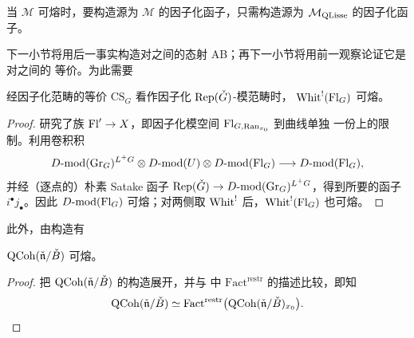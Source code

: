 \begin{remark}
当 $\mathcal{M}$ 可熔时，要构造源为 $\mathcal{M}$ 的因子化函子，只需构造源为
$\mathcal{M}_{\mathrm{QLisse}}$ 的因子化函子。

下一小节将用后一事实构造对之间的态射 AB；再下一小节将用前一观察论证它是对之间的
等价。为此需要
\end{remark}

\begin{proposition}
\label{prop:whitFl-fusable}
经因子化范畴的等价 $\mathrm{CS}_G$ 看作因子化 $\mathrm{Rep}(\check G)$-模范畴时，
$\mathrm{Whit}^{!}(\mathrm{Fl}_G)$ 可熔。
\end{proposition}

\begin{proof}
\cite{Gai04} 研究了族 $\mathrm{Fl}'\to X$，即因子化模空间 $\mathrm{Fl}_{G,\mathrm{Ran}_{x_0}}$ 到曲线单独
一份上的限制。利用卷积积
\[
D\text{-}\mathrm{mod}(\mathrm{Gr}_G)^{L^+G}\otimes D\text{-}\mathrm{mod}(U)
\otimes D\text{-}\mathrm{mod}(\mathrm{Fl}_G)\longrightarrow D\text{-}\mathrm{mod}(\mathrm{Fl}_G),
\]
并经（逐点的）朴素 Satake 函子
$\mathrm{Rep}(\check G)\to D\text{-}\mathrm{mod}(\mathrm{Gr}_G)^{L^+G}$，得到所要的函子
$i^{\bullet}j_{\bullet}$。因此 $D\text{-}\mathrm{mod}(\mathrm{Fl}_G)$ 可熔；对两侧取
$\mathrm{Whit}^{!}$ 后，$\mathrm{Whit}^{!}(\mathrm{Fl}_G)$ 也可熔。
\end{proof}

此外，由构造有

\begin{proposition}
\label{prop:qcoh-nB-fusable}
$\mathrm{QCoh}(\check{\mathfrak{n}}/\check B)$ 可熔。
\end{proposition}

\begin{proof}
把 $\mathrm{QCoh}(\check{\mathfrak{n}}/\check B)$ 的构造展开，并与 \cite{Bog24} 中
$\mathrm{Fact}^{\mathrm{restr}}$ 的描述比较，即知
\[
\mathrm{QCoh}(\check{\mathfrak{n}}/\check B)
\simeq \mathrm{Fact}^{\mathrm{restr}}\bigl(\mathrm{QCoh}(\check{\mathfrak{n}}/\check B)_{x_0}\bigr).
\]
\end{proof}

